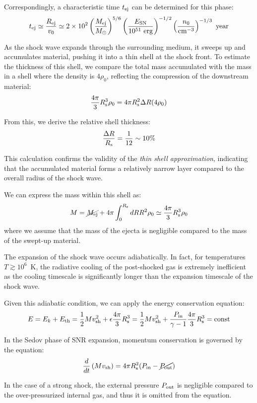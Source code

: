 Correspondingly, a characteristic time \( t_{\rm ej} \) can be determined for this phase:
%
\[
t_{\rm ej} \simeq \frac{R_{\rm ej}}{v_0} \simeq 2 \times 10^2 \left(\frac{M_{\rm ej}}{M_\odot}\right)^{5/6} \left(\frac{E_{\rm SN}}{10^{51}~\text{erg}}\right)^{-1/2} \left(\frac{n_0}{\text{cm}^{-3}}\right)^{-1/3}~\text{year}
\]

As the shock wave expands through the surrounding medium, it sweeps up and accumulates material, pushing it into a thin shell at the shock front. To estimate the thickness of this shell, we compare the total mass accumulated with the mass in a shell where the density is \( 4 \rho_0 \), reflecting the compression of the downstream material:
%
\[ \frac{4\pi}{3} R_{\rm s}^3 \rho_0 = 4 \pi R_{\rm s}^2 \Delta R (4 \rho_0) \]

From this, we derive the relative shell thickness: \[ \frac{\Delta R}{R_{\rm s}} = \frac{1}{12} \sim 10\% \] 

This calculation confirms the validity of the \emph{thin shell approximation}, indicating that the accumulated material forms a relatively narrow layer compared to the overall radius of the shock wave.

We can express the mass within this shell as:
%
\[
M = \cancel{M_{\rm ej}} + 4\pi \int_0^{R_{\rm s}} dR R^2 \rho_0 \simeq \frac{4\pi}{3} R^3_{\rm s} \rho_0
\]
%
where we assume that the mass of the ejecta is negligible compared to the mass of the swept-up material.

The expansion of the shock wave occurs adiabatically. In fact, for temperatures \( T \gtrsim 10^6 \)~K, the radiative cooling of the post-shocked gas is extremely inefficient as the cooling timescale is significantly longer than the expansion timescale of the shock wave. 

Given this adiabatic condition, we can apply the {\color{red}energy conservation equation}:
%
\[
E = E_k + E_{\rm th} 
= \frac{1}{2} M v_{\rm sh}^2 + \epsilon \frac{4\pi}{3} R^3_{\rm s} 
= \frac{1}{2} M v_{\rm sh}^2 + \frac{P_{\rm in}}{\gamma - 1} \frac{4\pi}{3} R^3_{\rm s} 
= \text{const}
\]

In the Sedov phase of SNR expansion, momentum conservation is governed by the equation:
%
\[
\frac{d}{dt} \left(M v_{\rm sh} \right) = 4\pi R^2_{\rm s} (P_{\rm in} - \cancel{P_{\rm out}})
\]


In the case of a strong shock, the external pressure \( P_{\rm out} \) is negligible compared to the over-pressurized internal gas, and thus it is omitted from the equation.

